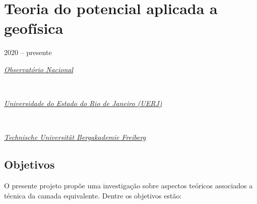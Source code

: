 
\section{Teoria do potencial aplicada a geofísica} 
\label{sec:projeto-teorico}

2020 -- presente
\vspace{0.3\baselineskip}\\
\noindent\parbox{0.03\textwidth}{\vspace{-0.2\baselineskip}\faUniversity} \href{https://www.gov.br/observatorio/pt-br}{\textsl{Observatório Nacional}}
\parbox{0.03\textwidth}{\vspace{-0.2\baselineskip} \hfill {}} \\
\noindent\parbox{0.03\textwidth}{\vspace{-0.2\baselineskip}\faUniversity}
\href{https://www.uerj.br/}{\textsl{Universidade do Estado do Rio de Janeiro (UERJ)}}
\parbox{0.03\textwidth}{\vspace{-0.2\baselineskip} \hfill {}} \\
\noindent\parbox{0.03\textwidth}{\vspace{-0.2\baselineskip}\faUniversity}
\href{https://tu-freiberg.de/universitaet}{\textsl{Technische Universität Bergakademie Freiberg}}
\parbox{0.04\textwidth}{\vspace{-0.2\baselineskip} \hfill {}}


\subsection*{Objetivos}

O presente projeto propõe uma investigação sobre aspectos teóricos associados a 
técnica da camada equivalente. Dentre os objetivos estão:

